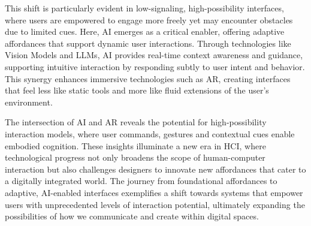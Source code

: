 This shift is particularly evident in low-signaling, high-possibility interfaces, where users are empowered to engage more freely yet may encounter obstacles due to limited cues.
Here, AI emerges as a critical enabler, offering adaptive affordances that support dynamic user interactions.
Through technologies like Vision Models and LLMs, AI provides real-time context awareness and guidance, supporting intuitive interaction by responding subtly to user intent and behavior.
This synergy enhances immersive technologies such as AR, creating interfaces that feel less like static tools and more like fluid extensions of the user’s environment.


The intersection of AI and AR reveals the potential for high-possibility interaction models, where user commands, gestures and contextual cues enable embodied cognition.%
These insights illuminate a new era in HCI, where technological progress not only broadens the scope of human-computer interaction but also challenges designers to innovate new affordances that cater to a digitally integrated world.
The journey from foundational affordances to adaptive, AI-enabled interfaces exemplifies a shift towards systems that empower users with unprecedented levels of interaction potential, ultimately expanding the possibilities of how we communicate and create within digital spaces.